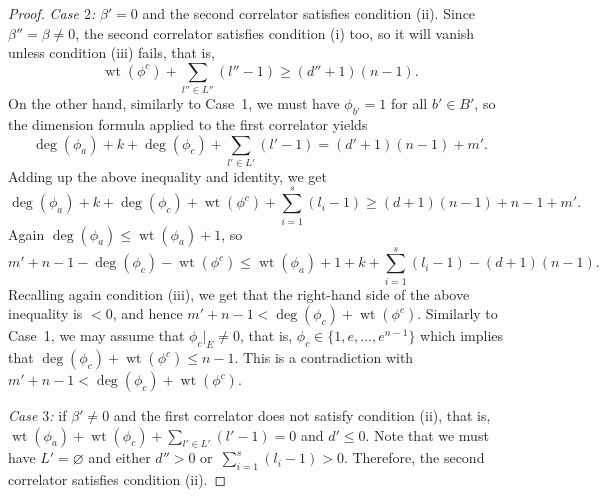 \documentclass[pdftex]{sigma}
\numberwithin{equation}{section}
\begin{document}
\begin{proof}
{\em Case $2$:} $\beta'=0$ and the second correlator satisfies condition (ii). Since $\beta''=\beta\neq 0$, the second correlator satisfies condition (i) too, so it will vanish unless condition (iii) fails, that is,
\[
\operatorname{wt}(\phi^c)+\sum_{l''\in L''} (l''-1) \geq (d''+1)(n-1).
\]
On the other hand, similarly to Case~1, we must have $\phi_{b'}=1$ for all $b'\in B'$, so the dimension formula applied to the first correlator yields
\[
\operatorname{deg}(\phi_a)+k + \operatorname{deg}(\phi_c)+
\sum_{l'\in L'} (l'-1) = (d'+1) (n-1) +m'.
\]
Adding up the above inequality and identity, we get
\[
\operatorname{deg}(\phi_a)+k + \operatorname{deg}(\phi_c)+
\operatorname{wt}(\phi^c)+
\sum_{i=1}^s (l_i-1) \geq (d+1)(n-1) +n-1+m'.
\]
Again $\operatorname{deg}(\phi_a)\leq \operatorname{wt}(\phi_a)+1$, so
\[
m'+n-1 - \operatorname{deg}(\phi_c)-\operatorname{wt}(\phi^c)\leq
\operatorname{wt}(\phi_a)+1+k +\sum_{i=1}^s (l_i-1) -(d+1)(n-1).
\]
Recalling again condition (iii), we get that the right-hand side of the above inequality is $<0$, and hence
$m'+n-1 < \operatorname{deg}(\phi_c)+\operatorname{wt}(\phi^c). $
Similarly to Case~1, we may assume that $\phi_c|_E\neq 0$, that is, $\phi_c\in \big\{ 1, e, \dots, e^{n-1}\big\}$ which implies that $\operatorname{deg}(\phi_c)+\operatorname{wt}(\phi^c)\leq n-1$. This is a contradiction with
$
m'+n-1 < \operatorname{deg}(\phi_c)+\operatorname{wt}(\phi^c)$.

{\em Case $3$:} if $\beta'\neq 0$ and the first correlator does not satisfy condition (ii), that is,
$\operatorname{wt}(\phi_a)+\operatorname{wt}(\phi_c) +\sum_{l'\in L'} (l'-1) =0$ and $d'\leq 0$. Note that we must have $L'=\varnothing$ and either $d''>0$ or~${\sum_{i=1}^s (l_i-1)>0}$. Therefore, the second correlator satisfies condition (ii).


\end{proof}
\end{document}
